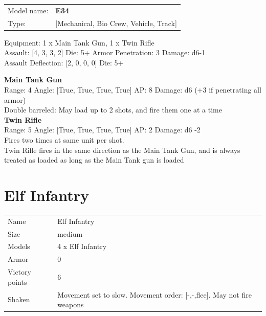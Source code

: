 \begin{tabular}{ll}
Model name: & {\bf E34 } \\
Type: & [Mechanical, Bio Crew, Vehicle, Track] \\
\end{tabular}

Equipment: 1 x Main Tank Gun, 1 x Twin Rifle \\

Assault: [4, 3, 3, 2] Die: 5+ Armor Penetration: 3 Damage: d6-1 \\
Assault Deflection: [2, 0, 0, 0] Die: 5+\\
\indent  



{\bf Main Tank Gun } \\



Range: 4  Angle: [True, True, True, True] AP: 8 Damage: d6 (+3 if penetrating all armor) \\
Double barreled: May load up to 2 shots, and fire them one at a time\\ 




{\bf Twin Rifle } \\



Range: 5  Angle: [True, True, True, True] AP: 2 Damage: d6 -2 \\
Fires two times at same unit per shot.\\Twin Rifle fires in the same direction as the Main Tank Gun, and is always treated as loaded as long as the Main Tank gun is loaded\\ 




 















\clearpage

\section{ Elf Infantry }

\begin{tabular}{ll}
  Name & Elf Infantry \\
  Size & medium\\
  Models & 4 x Elf Infantry\\
  Armor & 0\\
  Victory points & 6\\
  Shaken & Movement set to slow. Movement order: [-,-,flee]. May not fire weapons\\
\end{tabular}

